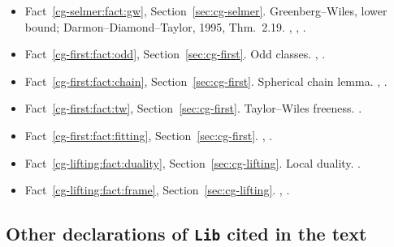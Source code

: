 \begin{itemize}[leftmargin=2em,itemsep=1pt]
\item Fact~\ref{cg-selmer:fact:gw}, Section~\ref{sec:cg-selmer}. Greenberg--Wiles, lower bound;
Darmon--Diamond--Taylor, 1995, Thm.~2.19. , , .
\item Fact~\ref{cg-first:fact:odd}, Section~\ref{sec:cg-first}. Odd classes. , .
\item Fact~\ref{cg-first:fact:chain}, Section~\ref{sec:cg-first}. Spherical chain lemma. , .
\item Fact~\ref{cg-first:fact:tw}, Section~\ref{sec:cg-first}. Taylor--Wiles freeness. .
\item Fact~\ref{cg-first:fact:fitting}, Section~\ref{sec:cg-first}. , .
\item Fact~\ref{cg-lifting:fact:duality}, Section~\ref{sec:cg-lifting}. Local duality. .
\item Fact~\ref{cg-lifting:fact:frame}, Section~\ref{sec:cg-lifting}. , .
\end{itemize}

\subsection*{Other declarations of \texttt{Lib} cited in the text}

